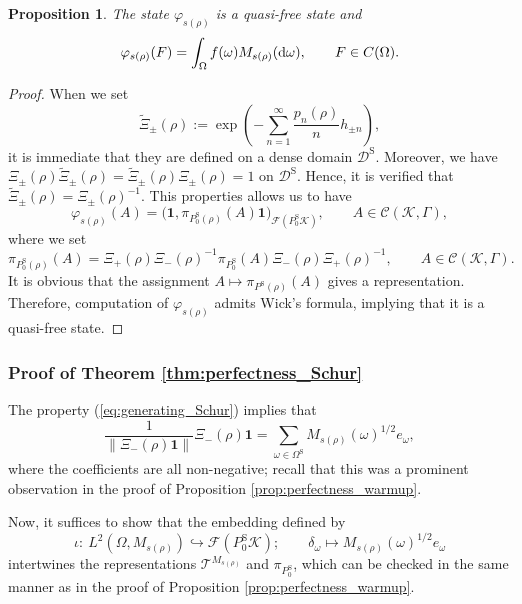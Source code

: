 \documentclass[pdftex]{sigma}
\numberwithin{equation}{section}
\newtheorem{Proposition}[Theorem]{Proposition}
 { \theoremstyle{definition}
\newtheorem{Definition}[Theorem]{Definition}
\newtheorem{Example}[Theorem]{Example}
\newtheorem{Remark}[Theorem]{Remark} }
\newcommand{\mcal}[1]{\mathcal{#1}}
\newcommand{\mrm}[1]{\mathrm{#1}}
\begin{document}
\begin{Proposition}\label{prop:Schur_measure_quasifree}
The state $\varphi_{s(\rho)}$ is a quasi-free state and
\begin{equation*}
	\varphi_{s(\rho)}(F)=\int_{\Omega}f(\omega)M_{s(\rho)}({\rm d}\omega),\qquad F\in C(\Omega).
\end{equation*}
\end{Proposition}
\begin{proof}When we set
\begin{equation*}
	\widetilde{\Xi}_{\pm}(\rho):=\exp\left(-\sum_{n=1}^{\infty}\frac{p_{n}(\rho)}{n}h_{\pm n}\right),
\end{equation*}
it is immediate that they are defined on a dense domain $\mcal{D}^{\mrm{S}}$. Moreover, we have $\Xi_{\pm}(\rho)\widetilde{\Xi}_{\pm}(\rho)=\widetilde{\Xi}_{\pm}(\rho)\Xi_{\pm}(\rho)=1$ on $\mcal{D}^{\mrm{S}}$. Hence, it is verified that $\widetilde{\Xi}_{\pm}(\rho)=\Xi_{\pm}(\rho)^{-1}$.
This properties allows us to have
\begin{equation*}
	\varphi_{s(\rho)}(A)=\big(\bm{1},\pi_{P_{0}^{\mrm{S}}(\rho)}(A)\bm{1}\big)_{\mcal{F}(P^{\mrm{S}}_{0}\mcal{K})},\qquad A\in \mcal{C}(\mcal{K},\Gamma),
\end{equation*}
where we set
\begin{equation*}
	\pi_{P_{0}^{\mrm{S}}(\rho)}(A)=\Xi_{+}(\rho)\Xi_{-}(\rho)^{-1}\pi_{P^{\mrm{S}}_{0}}(A)\Xi_{-}(\rho)\Xi_{+}(\rho)^{-1},\qquad A\in \mcal{C}(\mcal{K},\Gamma).
\end{equation*}
It is obvious that the assignment $A\mapsto \pi_{P^{\mrm{S}}(\rho)}(A)$ gives a representation. Therefore, computation of $\varphi_{s(\rho)}$ admits Wick's formula, implying that it is a quasi-free state.
\end{proof}

\subsubsection{Proof of Theorem \ref{thm:perfectness_Schur}}
The property (\ref{eq:generating_Schur}) implies that
\begin{equation*}
	\frac{1}{\|\Xi_{-}(\rho)\bm{1}\|}\Xi_{-}(\rho)\bm{1}=\sum_{\omega\in \Omega^{\mrm{S}}}M_{s(\rho)}(\omega)^{1/2}e_{\omega},
\end{equation*}
where the coefficients are all non-negative; recall that this was a prominent observation in the proof of Proposition \ref{prop:perfectness_warmup}.

Now, it suffices to show that the embedding defined by
\begin{equation*}
	\iota \colon \ L^{2}(\Omega,M_{s(\rho)})\hookrightarrow \mcal{F}(P^{\mrm{S}}_{0}\mcal{K});\qquad \delta_{\omega}\mapsto M_{s(\rho)}(\omega)^{1/2}e_{\omega}
\end{equation*}
intertwines the representations $\mcal{T}^{M_{s(\rho)}}$ and $\pi_{P^{\mrm{S}}_{0}}$, which can be checked in the same manner as in the proof of Proposition \ref{prop:perfectness_warmup}.
\end{document}
